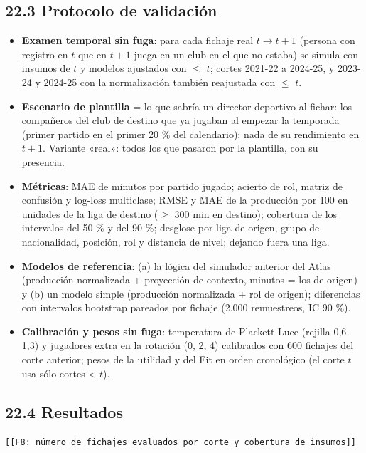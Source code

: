 \documentclass[10pt,a4paper]{article}
\newcommand{\fochopendiente}[1]{\textcolor{red!60!black}{\texttt{[[F8: #1]]}}}
\begin{document}
\subsection*{22.3 Protocolo de validación}
\begin{itemize}
  \item \textbf{Examen temporal sin fuga}: para cada fichaje real $t \to t+1$ (persona con registro en $t$ que en $t+1$ juega en un club en el que no estaba) se simula con insumos de $t$ y modelos ajustados con \ensuremath{\leq} $t$; cortes 2021-22 a 2024-25, y 2023-24 y 2024-25 con la normalización también reajustada con \ensuremath{\leq} $t$.
  \item \textbf{Escenario de plantilla} = lo que sabría un director deportivo al fichar: los compañeros del club de destino que ya jugaban al empezar la temporada (primer partido en el primer 20 \% del calendario); nada de su rendimiento en $t+1$. Variante «real»: todos los que pasaron por la plantilla, con su presencia.
  \item \textbf{Métricas}: MAE de minutos por partido jugado; acierto de rol, matriz de confusión y log-loss multiclase; RMSE y MAE de la producción por 100 en unidades de la liga de destino (\ensuremath{\geq} 300 min en destino); cobertura de los intervalos del 50 \% y del 90 \%; desglose por liga de origen, grupo de nacionalidad, posición, rol y distancia de nivel; dejando fuera una liga.
  \item \textbf{Modelos de referencia}: (a) la lógica del simulador anterior del Atlas (producción normalizada + proyección de contexto, minutos = los de origen) y (b) un modelo simple (producción normalizada + rol de origen); diferencias con intervalos bootstrap pareados por fichaje (2.000 remuestreos, IC 90 \%).
  \item \textbf{Calibración y pesos sin fuga}: temperatura de Plackett-Luce (rejilla 0,6-1,3) y jugadores extra en la rotación (0, 2, 4) calibrados con 600 fichajes del corte anterior; pesos de la utilidad y del Fit en orden cronológico (el corte $t$ usa sólo cortes < $t$).
\end{itemize}
\subsection*{22.4 Resultados}
\fochopendiente{número de fichajes evaluados por corte y cobertura de insumos}
\end{document}
